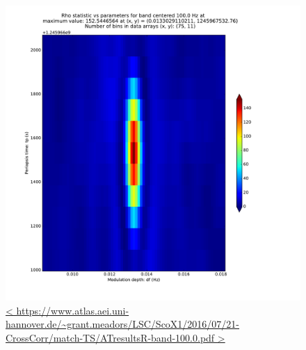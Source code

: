 \documentclass{article}
\begin{document}
\begin{figure}
\begin{center}
\includegraphics[trim= 0 0 0 0, clip, width=0.80\paperwidth,keepaspectratio]{plots/match-TS/ATresultsR-band-100-0.pdf}
\caption{
\url{<
https://www.atlas.aei.uni-hannover.de/~grant.meadors/LSC/ScoX1/2016/07/21-CrossCorr/match-TS/ATresultsR-band-100.0.pdf
>}
}
\label{ATcenterGraph}
\end{center}
\end{figure}
\end{document}
